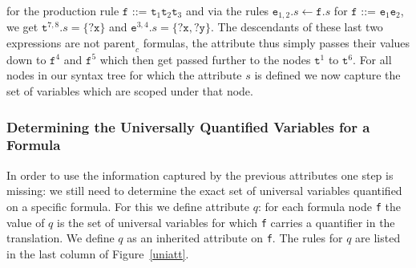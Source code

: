 for the production rule
$\texttt{f ::= t}_1\texttt{t}_2\texttt{t}_3$
and via the rules $\texttt{e}_{1,2}.s\leftarrow \texttt{f}.s$ for $\texttt{f ::= e}_1\texttt{e}_2$, we get $\texttt{t}^{7,8}.s= \{\texttt{?x}\}$ and
 $\texttt{e}^{3,4}.s=\{\texttt{?x},\texttt{?y}\}$. %
The descendants of these last two expressions are not $\text{parent}_c$ formulas, the attribute thus simply passes their values down to $\texttt{f}^4$ and $\texttt{f}^5$ which then get passed further to
the nodes
 $\texttt{t}^1$ to $\texttt{t}^6$. %
For all nodes in our syntax tree for which the attribute $s$ is defined we now capture the set of variables which are scoped under that node.



\subsubsection*{Determining the Universally Quantified Variables for a Formula }
In order to use the information captured by the previous attributes one step is missing: we still need to determine the exact set of universal variables quantified
on a specific formula. For this we define attribute $q$:  %
for each formula node \texttt{f} the value of $q$ is  
the set of universal variables 
for which \texttt{f} carries a quantifier in the translation. We define $q$ as an inherited attribute on \texttt{f}. The rules for $q$ are listed
in the last column of Figure~\ref{uniatt}. 

